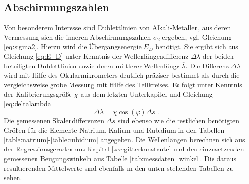 \subsection{Abschirmungszahlen}
Von besonderem Interesse sind Dublettlinien von Alkali-Metallen, aus deren Vermessung sich die inneren Abschirmungszahlen $\sigma_2$ ergeben, vgl. Gleichung \eqref{eq:sigma2}. Hierzu wird die Übergangsenergie $E_D$ benötigt. Sie ergibt sich aus Gleichung \eqref{eq:E_D} unter Kenntnis der Wellenlängendifferenz $\Delta \lambda$ der beiden beteiligten Dublettlinien sowie deren mittlerer Wellenlänge $\overline{\lambda}$. Die Differenz $\Delta \lambda$ wird mit Hilfe des Okularmikrometers deutlich präziser bestimmt als durch die vergleichsweise grobe Messung mit Hilfe des Teilkreises. Es folgt unter Kenntnis der Kalibrierungsgröße $\chi$ aus dem letzten Unterkapitel und Gleichung \eqref{eq:deltalambda}
\begin{equation*}
  \Delta\lambda = \chi \cos(\overline{\varphi}) \Delta s  \; .
\end{equation*}
Die gemessenen Skalendifferenzen $\Delta s$ sind ebenso wie die restlichen benötigten Größen für die Elemente Natrium, Kalium und Rubidium in den Tabellen \ref{table:natrium}-\ref{table:rubidium} angegeben. Die Wellenlängen berechnen sich aus der Regressionsgeraden aus Kapitel \ref{sec:gitterkonstante} und den einzusetzenden gemessenen Beugungswinkeln aus Tabelle \ref{tab:messdaten_winkel}. Die daraus resultierenden Mittelwerte sind ebenfalls in den unten stehenden Tabellen zu sehen.

